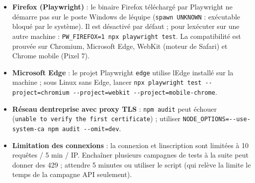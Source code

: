 \documentclass[
  11pt,
]{article}
\providecommand{\tightlist}{%
  \setlength{\itemsep}{0pt}\setlength{\parskip}{0pt}}
\begin{document}
\begin{itemize}
\tightlist
\item
  \textbf{Firefox (Playwright)} : le binaire Firefox téléchargé par
  Playwright ne démarre pas sur le poste Windows de
  l\textquotesingle équipe (\texttt{spawn\ UNKNOWN} : exécutable bloqué
  par le système). Il est désactivé par défaut ; pour
  l\textquotesingle exécuter sur une autre machine :
  \texttt{PW\_}\allowbreak{}\texttt{FIREFOX=1\ npx\ playwright\ test}.
  La compatibilité est prouvée sur Chromium, Microsoft Edge, WebKit
  (moteur de Safari) et Chrome mobile (Pixel 7).
\item
  \textbf{Microsoft Edge} : le projet Playwright \texttt{edge} utilise
  l\textquotesingle Edge installé sur la machine ; sous Linux sans Edge,
  lancer
  \texttt{npx\ playwright\ test\ -}\allowbreak{}\texttt{-}\allowbreak{}\texttt{project=chromium\ -}\allowbreak{}\texttt{-}\allowbreak{}\texttt{project=webkit\ -}\allowbreak{}\texttt{-}\allowbreak{}\texttt{project=mobile-}\allowbreak{}\texttt{chrome}.
\item
  \textbf{Réseau d\textquotesingle entreprise avec proxy TLS} :
  \texttt{npm\ audit} peut échouer
  (\texttt{unable\ to\ verify\ the\ first\ certificate}) ; utiliser
  \texttt{NODE\_}\allowbreak{}\texttt{OPTIONS=-}\allowbreak{}\texttt{-}\allowbreak{}\texttt{use-}\allowbreak{}\texttt{system-}\allowbreak{}\texttt{ca\ npm\ audit\ -}\allowbreak{}\texttt{-}\allowbreak{}\texttt{omit=dev}.
\item
  \textbf{Limitation des connexions} : la connexion et
  l\textquotesingle inscription sont limitées à 10 requêtes / 5 min /
  IP. Enchaîner plusieurs campagnes de tests à la suite peut donner des
  429 ; attendre 5 minutes ou utiliser le script (qui relève la limite
  le temps de la campagne API seulement).
\end{itemize}
\end{document}
